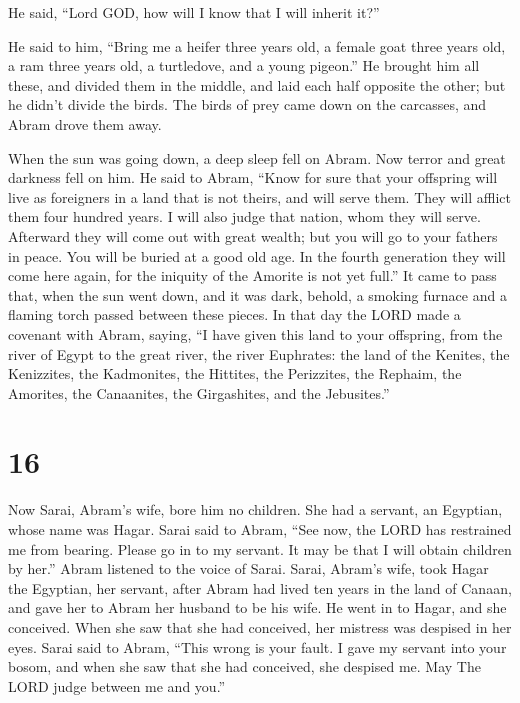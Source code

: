  He said, ``Lord GOD, how will I know that I will inherit
it?''

 He said to him, ``Bring me a heifer three years old, a
female goat three years old, a ram three years old, a turtledove, and a
young pigeon.''  He brought him all these, and divided them
in the middle, and laid each half opposite the other; but he didn't
divide the birds.  The birds of prey came down on the
carcasses, and Abram drove them away.

 When the sun was going down, a deep sleep fell on Abram.
Now terror and great darkness fell on him.  He said to
Abram, ``Know for sure that your offspring will live as foreigners in a
land that is not theirs, and will serve them. They will afflict them
four hundred years.  I will also judge that nation, whom
they will serve. Afterward they will come out with great wealth;
 but you will go to your fathers in peace. You will be
buried at a good old age.  In the fourth generation they
will come here again, for the iniquity of the Amorite is not yet full.''
 It came to pass that, when the sun went down, and it was
dark, behold, a smoking furnace and a flaming torch passed between these
pieces.  In that day the LORD made a covenant with Abram,
saying, ``I have given this land to your offspring, from the river of
Egypt to the great river, the river Euphrates:  the land of
the Kenites, the Kenizzites, the Kadmonites,  the Hittites,
the Perizzites, the Rephaim,  the Amorites, the Canaanites,
the Girgashites, and the Jebusites.''

\hypertarget{section-15}{%
\section{16}\label{section-15}}

 Now Sarai, Abram's wife, bore him no children. She had a
servant, an Egyptian, whose name was Hagar.  Sarai said to
Abram, ``See now, the LORD has restrained me from bearing. Please go in
to my servant. It may be that I will obtain children by her.'' Abram
listened to the voice of Sarai.  Sarai, Abram's wife, took
Hagar the Egyptian, her servant, after Abram had lived ten years in the
land of Canaan, and gave her to Abram her husband to be his wife.
 He went in to Hagar, and she conceived. When she saw that
she had conceived, her mistress was despised in her eyes. 
Sarai said to Abram, ``This wrong is your fault. I gave my servant into
your bosom, and when she saw that she had conceived, she despised me.
May The LORD judge between me and you.''

